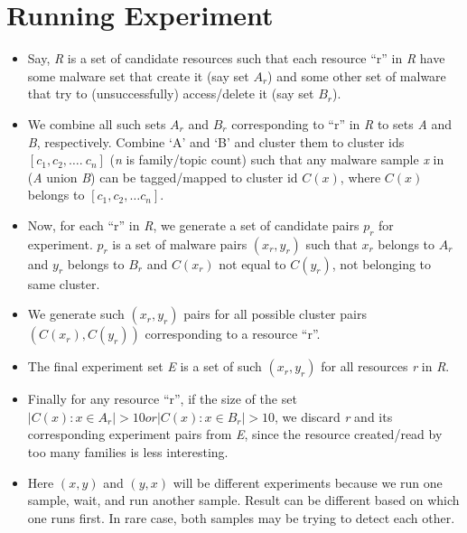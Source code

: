 \section{Running Experiment}
\label{sec:Running Experiment}
\begin{itemize}
  \item Say, \emph{R} is a set of candidate resources such that each resource ``r'' in \emph{R} have some malware set that create it (say set $A_r$) and some other set of malware that try to (unsuccessfully) access/delete it (say set $B_r$).
    \item We combine all such sets $A_r$ and $B_r$ corresponding to ``r'' in \emph{R} to sets \emph{A} and \emph{B}, respectively. Combine `A' and `B' and cluster them to cluster ids $[c_1,c_2,\ldots.\ c_n]$ (\emph{n} is family/topic count) such that any malware sample \emph{x} in (\emph{A} union \emph{B}) can be tagged/mapped to cluster id $C(x)$, where $C(x)$ belongs to $[c_1, c_2, \ldots c_n]$.
    \item Now, for each ``r'' in \emph{R}, we generate a set of candidate pairs $p_r$ for experiment. $p_r$ is a set of malware pairs $(x_r, y_r)$ such that $x_r$ belongs to $A_r$ and $y_r$ belongs to $B_r$ and $C(x_r)$ not equal to $C(y_r)$, not belonging to same cluster.
    \item We generate such $(x_r, y_r)$ pairs for all possible cluster pairs $(C(x_r), C(y_r))$ corresponding to a resource ``r''.
    \item The final experiment set \emph{E} is a set of such $(x_r, y_r)$ for all resources \emph{r} in \emph{R}.
    \item Finally for any resource ``r'', if the size of the set $| C(x) : x \in A_r | > 10 or  | C(x) : x \in B_r | > 10$, we discard \emph{r} and its corresponding experiment pairs from \emph{E}, since the resource created/read by too many families is less interesting.
    \item Here $(x,y)$ and $(y,x)$ will be different experiments because we run one sample, wait, and run another sample. Result can be different based on which one runs first. In rare case, both samples may be trying to detect each other.
\end{itemize}
